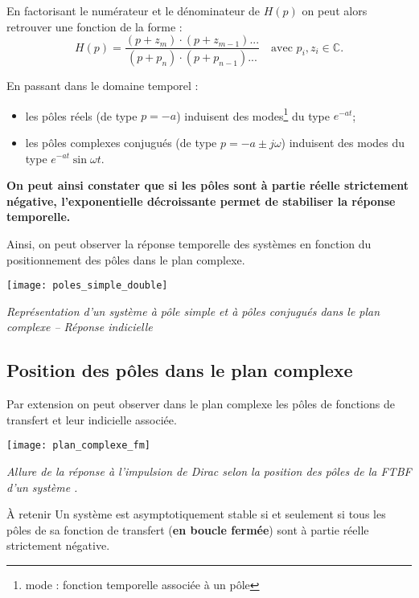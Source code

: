 En factorisant le numérateur et le dénominateur de $H(p)$ on peut alors retrouver une fonction de la forme  :
$$
H(p)=\dfrac{\left(p+ z_m\right)\cdot \left(p+ z_{m-1}\right)...}{\left(p+ p_n\right)\cdot \left(p+ p_{n-1}\right)...} \quad \text{avec } p_i,z_i\in \mathbb{C}.
$$

En passant dans le domaine temporel : 
\begin{itemize}
\item les pôles réels (de type $p=-a$) induisent des modes\footnote{mode : fonction temporelle associée à un pôle} du type $e^{-at}$;
\item les pôles complexes conjugués (de type $p=-a\pm j\omega$) induisent des modes du type 
$e^{-at} \sin \omega t$.
\end{itemize}

\textbf{On peut ainsi constater que si les pôles sont à partie réelle strictement négative, l'exponentielle décroissante permet de stabiliser la réponse temporelle.}

Ainsi, on peut observer la réponse temporelle des systèmes en fonction du positionnement des pôles dans le plan complexe. 

\begin{center}
\texttt{[image: poles\_simple\_double]}

\textit{Représentation d'un système à pôle simple et à pôles conjugués dans le plan complexe -- Réponse indicielle}
\end{center}

\subsection{Position des pôles dans le plan complexe}
Par extension on peut observer dans le plan complexe les pôles de fonctions de transfert et leur indicielle associée.

\begin{center}
\texttt{[image: plan\_complexe\_fm]}

\textit{Allure de la réponse à l’impulsion de Dirac selon la position des pôles de la FTBF d’un système \cite{2}.}
\end{center}

\begin{defi}{À retenir}
Un système est asymptotiquement stable si et seulement si tous les pôles de sa fonction de transfert (\textbf{en boucle fermée}) sont à partie réelle strictement négative. 

\end{defi}

